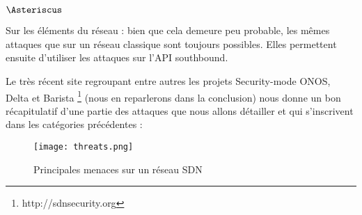 \begin{list}{$\Asteriscus$}{}
\item Sur les éléments du réseau : bien que cela demeure peu probable, les mêmes attaques que sur un réseau classique sont toujours possibles. Elles permettent ensuite d'utiliser les attaques sur l'API southbound.

\end{list}

Le très récent site regroupant entre autres les projets Security-mode ONOS, Delta et Barista \footnote{http://sdnsecurity.org} (nous en reparlerons dans la conclusion) nous donne un bon récapitulatif d'une partie des attaques que nous allons détailler et qui s'inscrivent dans les catégories précédentes :
\begin{figure}[h]
  	\centering
  	\texttt{[image: threats.png]}
  	\caption{Principales menaces sur un réseau SDN}
\end{figure}
